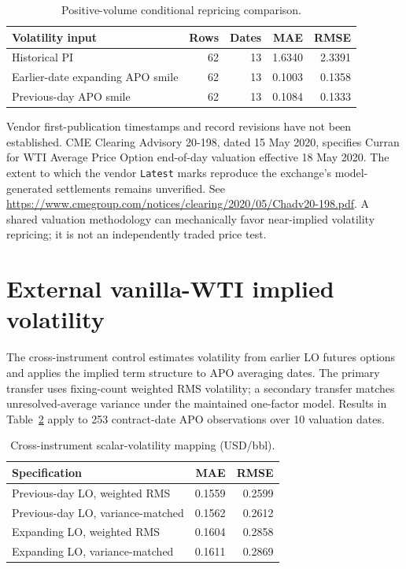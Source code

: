 \documentclass[10pt]{article}
\begin{document}
\begin{table}[htbp]\centering\small
\caption{Positive-volume conditional repricing comparison.}\label{tab:s3}
\begin{tabular}{lrrrr}\toprule
Volatility input & Rows & Dates & MAE & RMSE\\\midrule
Historical PI & 62 & 13 & 1.6340 & 2.3391\\
Earlier-date expanding APO smile & 62 & 13 & 0.1003 & 0.1358\\
Previous-day APO smile & 62 & 13 & 0.1084 & 0.1333\\\bottomrule
\end{tabular}
\end{table}

\noindent Vendor first-publication timestamps and record revisions have not
been established. CME Clearing Advisory 20-198, dated 15 May 2020, specifies
Curran for WTI Average Price Option end-of-day valuation effective 18 May
2020. The extent to which the vendor \texttt{Latest} marks reproduce
the exchange's model-generated settlements remains unverified. See
\url{https://www.cmegroup.com/notices/clearing/2020/05/Chadv20-198.pdf}.
A shared valuation methodology can mechanically favor near-implied
volatility repricing; it is not an independently traded price test.

\section{External vanilla-WTI implied volatility}
The cross-instrument control estimates volatility from earlier LO futures
options and applies the implied term structure to APO averaging dates.
The primary transfer uses fixing-count weighted RMS volatility; a
secondary transfer matches unresolved-average variance under the
maintained one-factor model. Results in Table~\ref{tab:s4} apply to 253
contract-date APO observations over 10 valuation dates.

\begin{table}[htbp]\centering\small
\caption{Cross-instrument scalar-volatility mapping (USD/bbl).}\label{tab:s4}
\begin{tabular}{lrr}\toprule
Specification & MAE & RMSE\\\midrule
Previous-day LO, weighted RMS & 0.1559 & 0.2599\\
Previous-day LO, variance-matched & 0.1562 & 0.2612\\
Expanding LO, weighted RMS & 0.1604 & 0.2858\\
Expanding LO, variance-matched & 0.1611 & 0.2869\\\bottomrule
\end{tabular}
\end{table}
\end{document}
